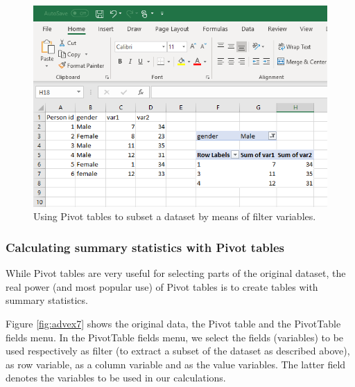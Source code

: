\documentclass[]{book}
\begin{document}
\begin{figure}

{\centering \includegraphics[width=0.8\linewidth]{_resources/chapter_advexc/5} 

}

\caption{Using Pivot tables to subset a dataset by means of filter variables.}\label{fig:advex6}
\end{figure}

\hypertarget{calculating-summary-statistics-with-pivot-tables}{%
\subsubsection*{Calculating summary statistics with Pivot tables}\label{calculating-summary-statistics-with-pivot-tables}}

While Pivot tables are very useful for selecting parts of the original dataset, the real power (and most popular use) of Pivot tables is to create tables with summary statistics.

Figure \ref{fig:advex7} shows the original data, the Pivot table and the PivotTable fields menu. In the PivotTable fields menu, we select the fields (variables) to be used respectively as filter (to extract a subset of the dataset as described above), as row variable, as a column variable and as the value variables. The latter field denotes the variables to be used in our calculations.
\end{document}
